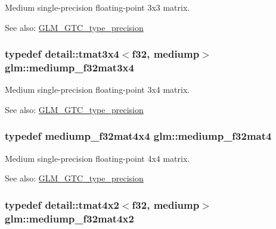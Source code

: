 Medium single-precision floating-point 3x3 matrix. \begin{Desc}
\item[See also:]\hyperlink{group__gtc__type__precision}{GLM\_\-GTC\_\-type\_\-precision} \end{Desc}
\hypertarget{group__gtc__type__precision_g7ad59b967576d930f4c8aa7b8c48e1af}{
\subsubsection[mediump\_\-f32mat3x4]{\setlength{\rightskip}{0pt plus 5cm}typedef detail::tmat3x4$<$f32, mediump$>$ {\bf glm::mediump\_\-f32mat3x4}}}
\label{group__gtc__type__precision_g7ad59b967576d930f4c8aa7b8c48e1af}


Medium single-precision floating-point 3x4 matrix. \begin{Desc}
\item[See also:]\hyperlink{group__gtc__type__precision}{GLM\_\-GTC\_\-type\_\-precision} \end{Desc}
\hypertarget{group__gtc__type__precision_g56bd98ec31b6abc0315d688d4ecd94a0}{
\subsubsection[mediump\_\-f32mat4]{\setlength{\rightskip}{0pt plus 5cm}typedef mediump\_\-f32mat4x4 {\bf glm::mediump\_\-f32mat4}}}
\label{group__gtc__type__precision_g56bd98ec31b6abc0315d688d4ecd94a0}


Medium single-precision floating-point 4x4 matrix. \begin{Desc}
\item[See also:]\hyperlink{group__gtc__type__precision}{GLM\_\-GTC\_\-type\_\-precision} \end{Desc}
\hypertarget{group__gtc__type__precision_g3400d5463f0a58cf3959406aa2b69f72}{
\subsubsection[mediump\_\-f32mat4x2]{\setlength{\rightskip}{0pt plus 5cm}typedef detail::tmat4x2$<$f32, mediump$>$ {\bf glm::mediump\_\-f32mat4x2}}}
\label{group__gtc__type__precision_g3400d5463f0a58cf3959406aa2b69f72}


